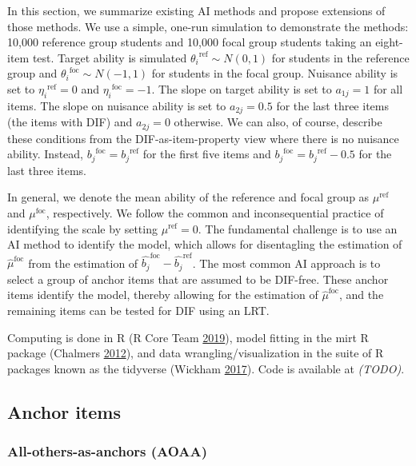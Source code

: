 \documentclass[
  11pt,
]{article}
\begin{document}
In this section, we summarize existing AI methods and propose extensions of those methods. We use a simple, one-run simulation to demonstrate the methods: 10,000 reference group students and 10,000 focal group students taking an eight-item test. Target ability is simulated \({\theta_i}^{\text{ref}} \sim N(0,1)\) for students in the reference group and \({\theta_i}^{\text{foc}} \sim N(-1,1)\) for students in the focal group. Nuisance ability is set to \({\eta_i}^{\text{ref}} = 0\) and \({\eta_i}^{\text{foc}} = -1\). The slope on target ability is set to \(a_{1j} = 1\) for all items. The slope on nuisance ability is set to \(a_{2j} = 0.5\) for the last three items (the items with DIF) and \(a_{2j} = 0\) otherwise. We can also, of course, describe these conditions from the DIF-as-item-property view where there is no nuisance ability. Instead, \({b_j}^{\text{foc}} = {b_j}^{\text{ref}}\) for the first five items and \({b_j}^{\text{foc}} = {b_j}^{\text{ref}} - 0.5\) for the last three items.

In general, we denote the mean ability of the reference and focal group as \(\mu^\text{ref}\) and \(\mu^\text{foc}\), respectively. We follow the common and inconsequential practice of identifying the scale by setting \(\mu^\text{ref} = 0\). The fundamental challenge is to use an AI method to identify the model, which allows for disentagling the estimation of \(\hat\mu^\text{foc}\) from the estimation of \(\hat{b_j}^{\text{foc}} - \hat{b_j}^{\text{ref}}\). The most common AI approach is to select a group of anchor items that are assumed to be DIF-free. These anchor items identify the model, thereby allowing for the estimation of \(\hat\mu^\text{foc}\), and the remaining items can be tested for DIF using an LRT.

Computing is done in R (R Core Team \protect\hyperlink{ref-rcore}{2019}), model fitting in the mirt R package (Chalmers \protect\hyperlink{ref-chalmers2012mirt}{2012}), and data wrangling/visualization in the suite of R packages known as the tidyverse (Wickham \protect\hyperlink{ref-tidy}{2017}). Code is available at \emph{(TODO)}.

\hypertarget{anchoritems}{%
\subsection{Anchor items}\label{anchoritems}}

\hypertarget{all-others-as-anchors-aoaa}{%
\subsubsection{All-others-as-anchors (AOAA)}\label{all-others-as-anchors-aoaa}}
\end{document}
